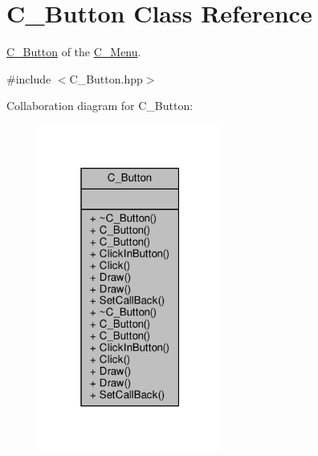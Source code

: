 \hypertarget{classC__Button}{}\section{C\+\_\+\+Button Class Reference}
\label{classC__Button}


\hyperlink{classC__Button}{C\+\_\+\+Button} of the \hyperlink{classC__Menu}{C\+\_\+\+Menu}.  




{\ttfamily \#include $<$C\+\_\+\+Button.\+hpp$>$}



Collaboration diagram for C\+\_\+\+Button\+:\nopagebreak
\begin{figure}[H]
\begin{center}
\leavevmode
\includegraphics[width=171pt]{classC__Button__coll__graph}
\end{center}
\end{figure}
